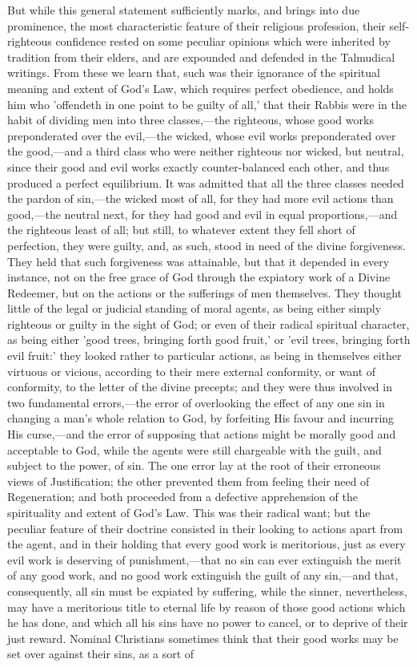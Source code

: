 \documentclass[
]{book}
\begin{document}
But while this general statement sufficiently marks, and brings into due prominence, the most characteristic feature of their religious profession, their self-righteous confidence rested on some peculiar opinions which were inherited by tradition from their elders, and are expounded and defended in the Talmudical writings. From these we learn that, such was their ignorance of the spiritual meaning and extent of God's Law, which requires perfect obedience, and holds him who 'offendeth in one point to be guilty of all,' that their Rabbis were in the habit of dividing men into three classes,---the righteous, whose good works preponderated over the evil,---the wicked, whose evil works preponderated over the good,---and a third class who were neither righteous nor wicked, but neutral, since their good and evil works exactly counter-balanced each other, and thus produced a perfect equilibrium. It was admitted that all the three classes needed the pardon of sin,---the wicked most of all, for they had more evil actions than good,---the neutral next, for they had good and evil in equal proportions,---and the righteous least of all; but still, to whatever extent they fell short of perfection, they were guilty, and, as such, stood in need of the divine forgiveness. They held that such forgiveness was attainable, but that it depended in every instance, not on the free grace of God through the expiatory work of a Divine Redeemer, but on the actions or the sufferings of men themselves. They thought little of the legal or judicial standing of moral agents, as being either simply righteous or guilty in the sight of God; or even of their radical spiritual character, as being either 'good trees, bringing forth good fruit,' or 'evil trees, bringing forth evil fruit:' they looked rather to particular actions, as being in themselves either virtuous or vicious, according to their mere external conformity, or want of conformity, to the letter of the divine precepts; and they were thus involved in two fundamental errors,---the error of overlooking the effect of any one sin in changing a man's whole relation to God, by forfeiting His favour and incurring His curse,---and the error of supposing that actions might be morally good and acceptable to God, while the agents were still chargeable with the guilt, and subject to the power, of sin. The one error lay at the root of their erroneous views of Justification; the other prevented them from feeling their need of Regeneration; and both proceeded from a defective apprehension of the spirituality and extent of God's Law. This was their radical want; but the peculiar feature of their doctrine consisted in their looking to actions apart from the agent, and in their holding that every good work is meritorious, just as every evil work is deserving of punishment,---that no sin can ever extinguish the merit of any good work, and no good work extinguish the guilt of any sin,---and that, consequently, all sin must be expiated by suffering, while the sinner, nevertheless, may have a meritorious title to eternal life by reason of those good actions which he has done, and which all his sins have no power to cancel, or to deprive of their just reward. Nominal Christians sometimes think that their good works may be set over against their sins, as a sort of 
\end{document}
